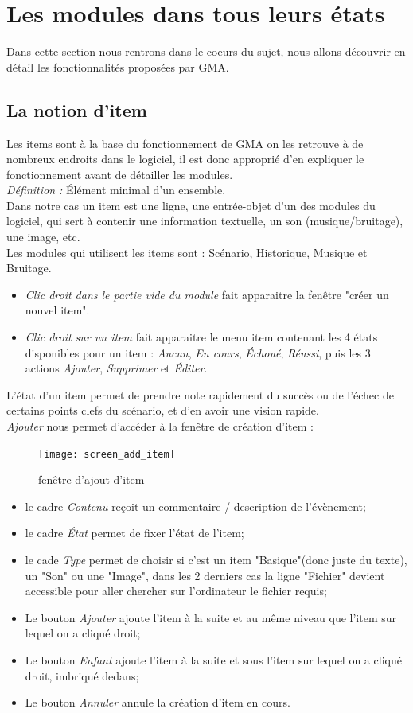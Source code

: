 \documentclass[a4paper,12pt]{article}
\begin{document}
\section{Les modules dans tous leurs états}\label{details}
Dans cette section nous rentrons dans le coeurs du sujet, nous allons découvrir en détail les fonctionnalités proposées par GMA.

\subsection{La notion d'item}\label{item}
Les items sont à la base du fonctionnement de GMA on les retrouve à de nombreux endroits dans le logiciel, il est donc approprié d'en expliquer le fonctionnement avant de détailler les modules.
\\
\emph{Définition : } Élément minimal d'un ensemble.
\\
Dans notre cas un item est une ligne, une entrée-objet d'un des modules du logiciel, qui sert à contenir une information textuelle, un son (musique/bruitage), une image, etc.
\\
Les modules qui utilisent les items sont : Scénario, Historique, Musique et Bruitage.

\begin{itemize}
    \item\emph{Clic droit dans le partie vide du module} fait apparaitre la fenêtre "créer un nouvel item".
    \item\emph{Clic droit sur un item} fait apparaitre le menu item contenant les 4 états disponibles pour un item : \emph{Aucun}, \emph{En cours}, \emph{Échoué}, \emph{Réussi}, puis les 3 actions \emph{Ajouter}, \emph{Supprimer} et \emph{Éditer}.
\end{itemize}
L'état d'un item permet de prendre note rapidement du succès ou de l'échec de certains points clefs du scénario, et d'en avoir une vision rapide.\\

\emph{Ajouter} nous permet d'accéder à la fenêtre de création d'item :
\begin{figure}[h]
    \texttt{[image: screen\_add\_item]}
    \caption{fenêtre d'ajout d'item}
\end{figure}
\begin{itemize}
    \item le cadre \emph{Contenu} reçoit un commentaire / description de l'évènement;
    \item le cadre \emph{État} permet de fixer l'état de l'item;
    \item le cade \emph{Type} permet de choisir si c'est un item "Basique"(donc juste du texte), un "Son" ou une "Image", dans les 2 derniers cas la ligne "Fichier" devient accessible pour aller chercher sur l'ordinateur le fichier requis;
    \item Le bouton \emph{Ajouter} ajoute l'item à la suite et au même niveau que l'item sur lequel on a cliqué droit;
    \item Le bouton \emph{Enfant} ajoute l'item à la suite et sous l'item sur lequel on a cliqué droit, imbriqué dedans;
    \item Le bouton \emph{Annuler} annule la création d'item en cours.
\end{itemize}
\end{document}
